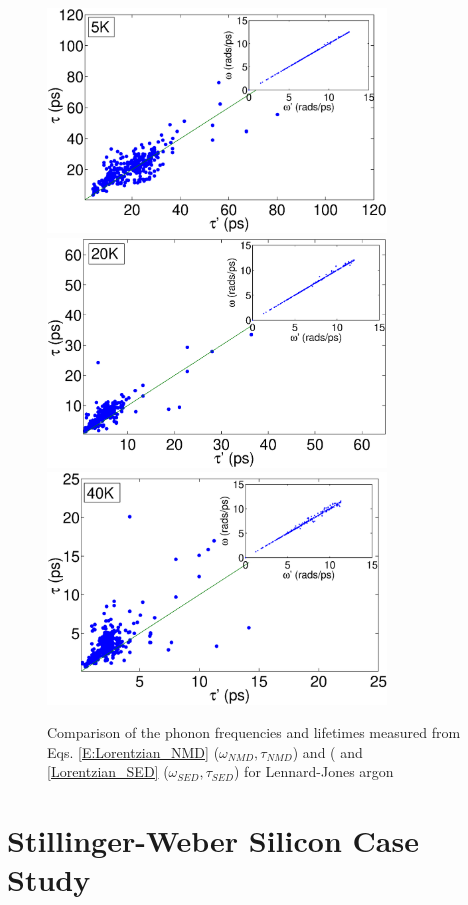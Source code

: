 \documentclass[twocolumn,10pt]{asme2e}
\begin{document}
\begin{figure}
\begin{center}
\includegraphics[angle=0,width=90.0mm]{LJ_NMD_SED_5K.eps}
\includegraphics[angle=0,width=90.0mm]{LJ_NMD_SED_20K.eps}
\includegraphics[angle=0,width=90.0mm]{LJ_NMD_SED_40K.eps}
\end{center}
\caption{\label{F:FREQ_LIFE_LJ} Comparison of the phonon frequencies and lifetimes measured from Eqs$.$ \eqref{E:Lorentzian_NMD} ($\omega_{NMD},\tau_{NMD}$) and   ( and \eqref{Lorentzian_SED} ($\omega_{SED},\tau_{SED}$) for Lennard-Jones argon}
\vspace*{-5mm}
\end{figure}

\section*{Stillinger-Weber Silicon Case Study}\label{S:Si_Case_study}
\end{document}
